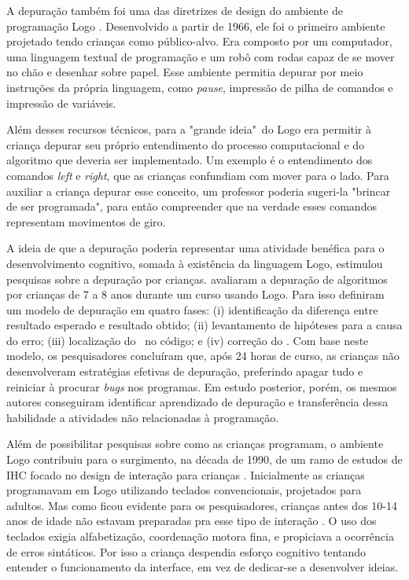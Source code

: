 A depuração também foi uma das diretrizes de design do ambiente de programação Logo \cite{solomon_history_2020}. Desenvolvido a partir de 1966, ele foi o primeiro ambiente projetado tendo crianças como público-alvo. Era composto por um computador, uma linguagem textual de programação e um robô com rodas capaz de se mover no chão e desenhar sobre papel. Esse ambiente permitia depurar por meio instruções da própria linguagem, como \textit{pause}, impressão de pilha de comandos e impressão de variáveis. 

Além desses recursos técnicos, para  a "grande ideia"\ do Logo era permitir à criança depurar seu próprio entendimento do processo computacional e do algoritmo que deveria ser implementado. Um exemplo é o entendimento dos comandos \textit{left} e \textit{right}, que as crianças confundiam com mover para o lado. Para auxiliar a criança depurar esse conceito, um professor poderia sugeri-la "brincar de ser programada", para então compreender que na verdade esses comandos representam movimentos de giro.

A ideia de que a depuração poderia representar uma atividade benéfica para o desenvolvimento cognitivo, somada à existência da linguagem Logo, estimulou pesquisas sobre a depuração por crianças.  avaliaram a depuração de algoritmos por crianças de 7 a 8 anos durante um curso usando Logo. Para isso definiram um modelo de depuração em quatro fases: (i) identificação da diferença entre resultado esperado e resultado obtido; (ii) levantamento de hipóteses para a causa do erro; (iii) localização do \bug\ no código; e (iv) correção do \bug. Com base neste modelo, os pesquisadores concluíram que, após 24 horas de curso, as crianças não desenvolveram estratégias efetivas de depuração, preferindo apagar tudo e reiniciar à procurar \textit{bugs} nos programas. Em estudo posterior, porém, os mesmos autores conseguiram identificar aprendizado de depuração e transferência dessa habilidade a atividades não relacionadas à programação.

Além de possibilitar pesquisas sobre como as crianças programam, o ambiente Logo contribuiu para o surgimento, na década de 1990, de um ramo de estudos de \ac{IHC} focado no design de interação para crianças \cite{hourcade_child-computer_2015}. Inicialmente as crianças programavam em Logo utilizando teclados convencionais, projetados para adultos. Mas como ficou evidente para os pesquisadores, crianças antes dos 10-14 anos de idade não estavam preparadas pra esse tipo de interação \cite{mcnerney_turtles_2004}. O uso dos teclados exigia alfabetização, coordenação motora fina, e propiciava a ocorrência de erros sintáticos. Por isso a criança despendia esforço cognitivo tentando entender o funcionamento da interface, em vez de dedicar-se a desenvolver ideias.

